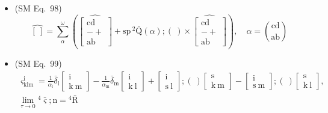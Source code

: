 \documentclass[
    12pt,              %
    a4paper,           %
    headings=normal,   %
    twoside=true,      %
    BCOR=8mm,          %
]{scrbook}
\begin{document}
\begin{itemize}[label={},leftmargin=0pt]
    \item (SM Eq.\ 98) 
    \[
    \widehat{[\ ]} = \sum_\alpha^\omega \left( \widehat{\left[ \begin{smallmatrix} \mathrm{cd} \\ - + \\ \mathrm{ab} \end{smallmatrix} \right]} + \mathrm{sp}\,{}^2\bar{\mathrm{Q}}(\alpha);(\ ) \times \widehat{\left[ \begin{smallmatrix} \mathrm{cd} \\ - + \\ \mathrm{ab} \end{smallmatrix} \right]} \right), \quad \alpha = \binom{\mathrm{cd}}{\mathrm{ab}}
    \]

    \item (SM Eq.\ 99) 
    \[
    \begin{gathered}
    \varsigma^\mathrm{i}_{\mathrm{klm}} = \frac{1}{\alpha_\mathrm{l}}\bar{\delta}_\mathrm{l} \left[ \begin{smallmatrix} \mathrm{i} \\ \mathrm{k}\ \mathrm{m} \end{smallmatrix} \right] - \frac{1}{\alpha_\mathrm{m}}\bar{\delta}_\mathrm{m} \left[ \begin{smallmatrix} \mathrm{i} \\ \mathrm{k}\ \mathrm{l} \end{smallmatrix} \right] + \left[ \begin{smallmatrix} \mathrm{i} \\ \mathrm{s}\ \mathrm{l} \end{smallmatrix} \right];(\ ) \left[ \begin{smallmatrix} \mathrm{s} \\ \mathrm{k}\ \mathrm{m} \end{smallmatrix} \right] - \left[ \begin{smallmatrix} \mathrm{i} \\ \mathrm{s}\ \mathrm{m} \end{smallmatrix} \right];(\ ) \left[ \begin{smallmatrix} \mathrm{s} \\ \mathrm{k}\ \mathrm{l} \end{smallmatrix} \right], \\
    \lim_{\tau \to 0} {}^4\bar{\bm{\varsigma}} ; \mathrm{n} = {}^4\bar{\mathrm{R}}
    \end{gathered}
    \]


\end{itemize}
\end{document}
